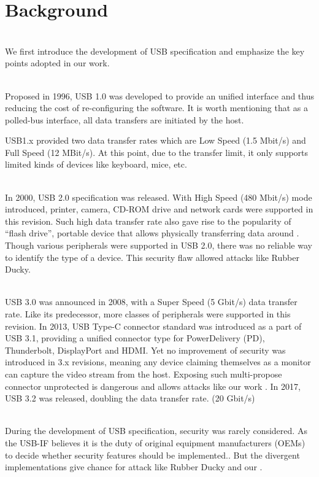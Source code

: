 \section{Background}
\label{sec:background}
\noindent{}\\
We first introduce the development of USB specification and emphasize the key points adopted in our work.

\noindent{}\\
Proposed in 1996, USB 1.0\cite{usb10} was developed to provide an unified interface and thus reducing the cost of re-configuring the software. It is worth mentioning that as a polled-bus interface, all data transfers are initiated by the host.

USB1.x\cite{usb10}\cite{usb11} provided two data transfer rates which are Low Speed (1.5 Mbit/s) and Full Speed (12 MBit/s). At this point, due to the transfer limit, it only supports limited kinds of devices like keyboard, mice, etc.

\noindent{}\\
In 2000, USB 2.0\cite{usb20} specification was released. With High Speed (480 Mbit/s) mode introduced, printer, camera, CD-ROM drive and network cards were supported in this revision. Such high data transfer rate also gave rise to the popularity of ``flash drive'', portable device that allows physically transferring data around \cite{sok}. Though various peripherals were supported in USB 2.0, there was no reliable way to identify the type of a device. This security flaw allowed attacks like Rubber Ducky\cite{rubber}.

\noindent{}\\
USB 3.0\cite{usb30} was announced in 2008, with a Super Speed (5 Gbit/s) data transfer rate. Like its predecessor, more classes of peripherals were supported in this revision. In 2013, USB Type-C connector standard was introduced as a part of USB 3.1\cite{usb31}, providing a unified connector type for PowerDelivery (PD), Thunderbolt, DisplayPort and HDMI.  Yet no improvement of security was introduced in 3.x revisions, meaning any device claiming themselves as a monitor can capture the video stream from the host. Exposing such multi-propose connector unprotected is dangerous and allows attacks like our work \tool. In 2017, USB 3.2\cite{usb32} was released, doubling the data transfer rate. (20 Gbit/s)

\noindent{}\\
During the development of USB specification, security was rarely considered.  As the USB-IF believes it is the duty of original equipment manufacturers (OEMs) to decide whether security features should be implemented.. But the divergent implementations give chance for attack like Rubber Ducky\cite{rubber} and our \tool.